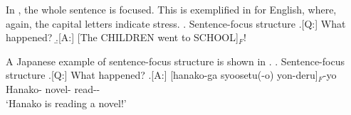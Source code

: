%
%
%


In ,
the whole sentence is focused.
This is exemplified in \Next[A] for English,
where, again, the capital letters indicate stress.
\ex. Sentence-focus structure
	\a.[Q:] What happened?
	\b.[A:] [The CHILDREN went to SCHOOL]$_{F}$!
	\hfill{\cite[][p.\ 121]{lambrecht94}}

A Japanese example of sentence-focus structure is shown in \Next[A].
\ex. Sentence-focus structure
	\a.[Q:] What happened? 
	\bg.[A:] [hanako-ga syoosetu(-o) yon-deru]$_{F}$-yo \\
		Hanako- novel- read-- \\
		`Hanako is reading a novel!'


